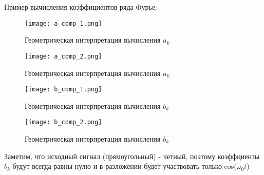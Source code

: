 Пример вычисления коэффициентов ряда Фурье:

\begin{figure}[H]
    \centering
    \texttt{[image: a\_comp\_1.png]}
    \caption{Геометрическая интерпретация вычисления $a_k$}
\end{figure}


\begin{figure}[H]
    \centering
    \texttt{[image: a\_comp\_2.png]}
    \caption{Геометрическая интерпретация вычисления $a_k$}
\end{figure}

\begin{figure}[H]
    \centering
    \texttt{[image: b\_comp\_1.png]}
    \caption{Геометрическая интерпретация вычисления $b_k$}
\end{figure}


\begin{figure}[H]
    \centering
    \texttt{[image: b\_comp\_2.png]}
    \caption{Геометрическая интерпретация вычисления $b_k$}
\end{figure}

Заметим, что исходный сигнал (прямоугольный) - четный, поэтому коэффциенты $b_k$ будут всегда равны нулю и в разложении
будет участвовать только cos($\omega_0t$)

\endinput